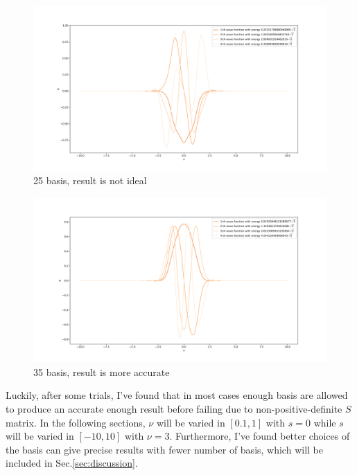 \documentclass{article}
\begin{document}
\begin{figure}[!htb]
    \centering
    \includegraphics[width=1\textwidth]{V2_dif_center_basisnum=25.png}
    \caption{25 basis, result is not ideal}
    \label{fig:V2_center_25_basis}
\end{figure}
\begin{figure}[!htb]
    \centering
    \includegraphics[width=1\textwidth]{V2_dif_center_basisnum=35.png}
    \caption{35 basis, result is more accurate}
    \label{fig:V2_center_35_basis}
\end{figure}

Luckily, after some trials, I've found that in most cases enough basis are allowed to produce an accurate enough result before failing due to non-positive-definite $S$ matrix. In the following sections, $\nu$ will be varied in $[0.1, 1]$ with $s=0$ while $s$ will be varied in $[-10, 10]$ with $\nu=3$. Furthermore, I've found better choices of the basis can give precise results with fewer number of basis, which will be included in Sec.\ref{sec:discussion}.
\end{document}
